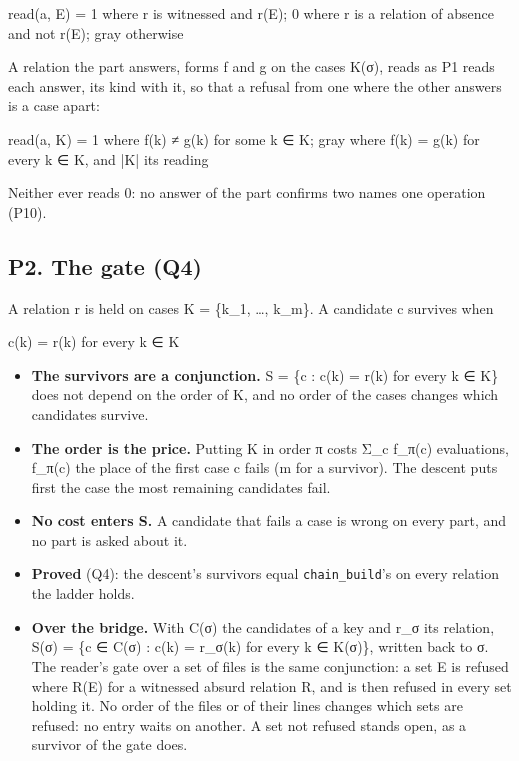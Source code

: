 read(a, E) = 1 where r is witnessed and r(E); 0 where r is a relation of absence and not r(E); gray otherwise

A relation the part answers, forms f and g on the cases K(σ), reads as P1 reads each answer, its kind with it, so that a refusal from one where the other answers is a case apart:

read(a, K) = 1 where f(k) ≠ g(k) for some k ∈ K; gray where f(k) = g(k) for every k ∈ K, and |K| its reading

Neither ever reads 0: no answer of the part confirms two names one operation (P10).

\subsection{\texorpdfstring{P2. The gate (Q4)}{P2. The gate (Q4)}}

A relation r is held on cases K = \{k\_\allowbreak{}1, …, k\_\allowbreak{}m\}. A candidate c survives when

c(k) = r(k) for every k ∈ K

\begin{itemize}
\item \textbf{The survivors are a conjunction.} S = \{c : c(k) = r(k) for every k ∈ K\} does not depend on the order of K, and no order of the cases changes which candidates survive.
\item \textbf{The order is the price.} Putting K in order π costs Σ\_\allowbreak{}c f\_\allowbreak{}π(c) evaluations, f\_\allowbreak{}π(c) the place of the first case c fails (m for a survivor). The descent puts first the case the most remaining candidates fail.
\item \textbf{No cost enters S.} A candidate that fails a case is wrong on every part, and no part is asked about it.
\item \textbf{Proved} (Q4): the descent's survivors equal \texttt{chain\_\allowbreak{}build}'s on every relation the ladder holds.
\item \textbf{Over the bridge.} With C(σ) the candidates of a key and r\_\allowbreak{}σ its relation, S(σ) = \{c ∈ C(σ) : c(k) = r\_\allowbreak{}σ(k) for every k ∈ K(σ)\}, written back to σ. The reader's gate over a set of files is the same conjunction: a set E is refused where R(E) for a witnessed absurd relation R, and is then refused in every set holding it. No order of the files or of their lines changes which sets are refused: no entry waits on another. A set not refused stands open, as a survivor of the gate does.
\end{itemize}

